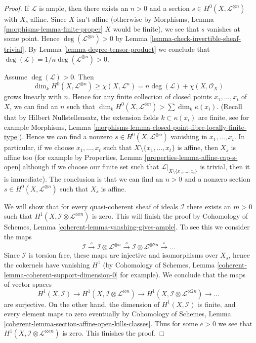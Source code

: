 \begin{proof}
If $\mathcal{L}$ is ample, then there exists an $n > 0$ and a section
$s \in H^0(X, \mathcal{L}^{\otimes n})$ with $X_s$ affine. Since
$X$ isn't affine (otherwise by
Morphisms, Lemma \ref{morphisms-lemma-finite-proper}
$X$ would be finite), we see that $s$ vanishes at some point.
Hence $\deg(\mathcal{L}^{\otimes n}) > 0$ by
Lemma \ref{lemma-check-invertible-sheaf-trivial}.
By Lemma \ref{lemma-degree-tensor-product}
we conclude that $\deg(\mathcal{L}) = 1/n\deg(\mathcal{L}^{\otimes n}) > 0$.

\medskip\noindent
Assume $\deg(\mathcal{L}) > 0$. Then
$$
\dim_k H^0(X, \mathcal{L}^{\otimes n}) \geq \chi(X, \mathcal{L}^n)
= n\deg(\mathcal{L}) + \chi(X, \mathcal{O}_X)
$$
grows linearly with $n$. Hence for any finite collection of closed
points $x_1, \ldots, x_t$ of $X$, we can find an $n$ such that
$\dim_k H^0(X, \mathcal{L}^{\otimes n}) > \sum \dim_k \kappa(x_i)$.
(Recall that by Hilbert Nullstellensatz, the extension fields
$k \subset \kappa(x_i)$ are finite, see for example
Morphisms, Lemma \ref{morphisms-lemma-closed-point-fibre-locally-finite-type}).
Hence we can find a nonzero $s \in H^0(X, \mathcal{L}^{\otimes n})$
vanishing in $x_1, \ldots, x_t$. In particular, if we choose
$x_1, \ldots, x_t$ such that $X \setminus \{x_1, \ldots, x_t\}$
is affine, then $X_s$ is affine too
(for example by Properties, Lemma \ref{properties-lemma-affine-cap-s-open}
although if we choose our finite set such that
$\mathcal{L}|_{X \setminus \{x_1, \ldots, x_t\}}$ is trivial, then
it is immediate). The conclusion is that we can find an $n > 0$
and a nonzero section $s \in H^0(X, \mathcal{L}^{\otimes n})$ such
that $X_s$ is affine.

\medskip\noindent
We will show that for every quasi-coherent sheaf of ideals $\mathcal{I}$
there exists an $m > 0$ such that
$H^1(X, \mathcal{I} \otimes \mathcal{L}^{\otimes m})$ is zero.
This will finish the proof by
Cohomology of Schemes, Lemma \ref{coherent-lemma-vanshing-gives-ample}.
To see this we consider the maps
$$
\mathcal{I} \xrightarrow{s}
\mathcal{I} \otimes \mathcal{L}^{\otimes n} \xrightarrow{s}
\mathcal{I} \otimes \mathcal{L}^{\otimes 2n} \xrightarrow{s} \ldots
$$
Since $\mathcal{I}$ is torsion free, these maps are injective and
isomorphisms over $X_s$, hence the cokernels have vanishing $H^1$
(by Cohomology of Schemes, Lemma
\ref{coherent-lemma-coherent-support-dimension-0} for example).
We conclude that the maps of vector spaces
$$
H^1(X, \mathcal{I}) \to
H^1(X, \mathcal{I} \otimes \mathcal{L}^{\otimes n}) \to
H^1(X, \mathcal{I} \otimes \mathcal{L}^{\otimes 2n}) \to \ldots
$$
are surjective. On the other hand, the dimension of $H^1(X, \mathcal{I})$
is finite, and every element maps to zero eventually by
Cohomology of Schemes, Lemma
\ref{coherent-lemma-section-affine-open-kills-classes}.
Thus for some $e > 0$ we see that
$H^1(X, \mathcal{I} \otimes \mathcal{L}^{\otimes en})$ is zero.
This finishes the proof.
\end{proof}

